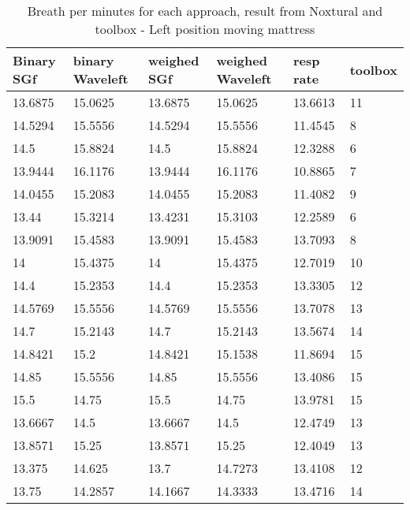 \begin{table}
\begin{tabular}{|llllll|}
\hline 
Binary SGf & binary Waveleft & weighed  SGf & weighed Waveleft & resp rate & toolbox \\ 
\hline 
13.6875 & 15.0625 & 13.6875 & 15.0625 & 13.6613 & 11 \\ 
14.5294 & 15.5556 & 14.5294 & 15.5556 & 11.4545 & 8 \\ 
14.5 & 15.8824 & 14.5 & 15.8824 & 12.3288 & 6 \\ 
13.9444 & 16.1176 & 13.9444 & 16.1176 & 10.8865 & 7 \\ 
14.0455 & 15.2083 & 14.0455 & 15.2083 & 11.4082 & 9 \\ 
13.44 & 15.3214 & 13.4231 & 15.3103 & 12.2589 & 6 \\ 
13.9091 & 15.4583 & 13.9091 & 15.4583 & 13.7093 & 8 \\ 
14 & 15.4375 & 14 & 15.4375 & 12.7019 & 10 \\ 
14.4 & 15.2353 & 14.4 & 15.2353 & 13.3305 & 12 \\ 
14.5769 & 15.5556 & 14.5769 & 15.5556 & 13.7078 & 13 \\ 
14.7 & 15.2143 & 14.7 & 15.2143 & 13.5674 & 14 \\ 
14.8421 & 15.2 & 14.8421 & 15.1538 & 11.8694 & 15 \\ 
14.85 & 15.5556 & 14.85 & 15.5556 & 13.4086 & 15 \\ 
15.5 & 14.75 & 15.5 & 14.75 & 13.9781 & 15 \\ 
13.6667 & 14.5 & 13.6667 & 14.5 & 12.4749 & 13 \\ 
13.8571 & 15.25 & 13.8571 & 15.25 & 12.4049 & 13 \\ 
13.375 & 14.625 & 13.7 & 14.7273 & 13.4108 & 12 \\ 
13.75 & 14.2857 & 14.1667 & 14.3333 & 13.4716 & 14 \\ 
\hline 
\end{tabular}
\caption{Breath per minutes for each approach, result from Noxtural and toolbox
- Left position moving mattress}
\end{table}
